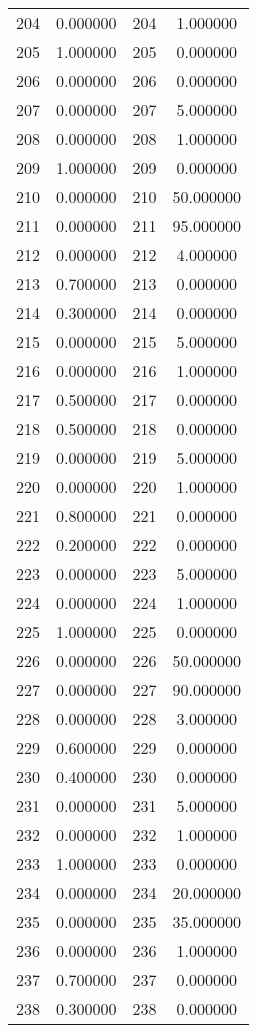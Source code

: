 \documentclass[12pt]{article}
\begin{document}
\begin{longtable}{@{}cccc@{}}
204 & 0.000000 & 204 & 1.000000 \\
205 & 1.000000 & 205 & 0.000000 \\
206 & 0.000000 & 206 & 0.000000 \\
207 & 0.000000 & 207 & 5.000000 \\
208 & 0.000000 & 208 & 1.000000 \\
209 & 1.000000 & 209 & 0.000000 \\
210 & 0.000000 & 210 & 50.000000 \\
211 & 0.000000 & 211 & 95.000000 \\
212 & 0.000000 & 212 & 4.000000 \\
213 & 0.700000 & 213 & 0.000000 \\
214 & 0.300000 & 214 & 0.000000 \\
215 & 0.000000 & 215 & 5.000000 \\
216 & 0.000000 & 216 & 1.000000 \\
217 & 0.500000 & 217 & 0.000000 \\
218 & 0.500000 & 218 & 0.000000 \\
219 & 0.000000 & 219 & 5.000000 \\
220 & 0.000000 & 220 & 1.000000 \\
221 & 0.800000 & 221 & 0.000000 \\
222 & 0.200000 & 222 & 0.000000 \\
223 & 0.000000 & 223 & 5.000000 \\
224 & 0.000000 & 224 & 1.000000 \\
225 & 1.000000 & 225 & 0.000000 \\
226 & 0.000000 & 226 & 50.000000 \\
227 & 0.000000 & 227 & 90.000000 \\
228 & 0.000000 & 228 & 3.000000 \\
229 & 0.600000 & 229 & 0.000000 \\
230 & 0.400000 & 230 & 0.000000 \\
231 & 0.000000 & 231 & 5.000000 \\
232 & 0.000000 & 232 & 1.000000 \\
233 & 1.000000 & 233 & 0.000000 \\
234 & 0.000000 & 234 & 20.000000 \\
235 & 0.000000 & 235 & 35.000000 \\
236 & 0.000000 & 236 & 1.000000 \\
237 & 0.700000 & 237 & 0.000000 \\
238 & 0.300000 & 238 & 0.000000 \\

\end{longtable}
\end{document}

